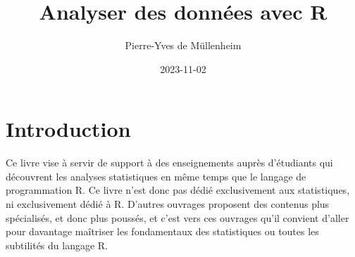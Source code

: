 \documentclass[
]{book}
\title{Analyser des données avec R}
\author{Pierre-Yves de Müllenheim}
\date{2023-11-02}
\begin{document}
\maketitle

\renewcommand*\contentsname{Sommaire}
{
\setcounter{tocdepth}{1}
\tableofcontents
}
\renewcommand{\listfigurename}{Liste des figures}
\renewcommand{\figurename}{Figure}
\renewcommand{\tablename}{Tableau}

\listoftables

\listoffigures

\hypertarget{introduction}{%
\chapter*{Introduction}\label{introduction}}

Ce livre vise à servir de support à des enseignements auprès d'étudiants qui découvrent les analyses statistiques en même temps que le langage de programmation R. Ce livre n'est donc pas dédié exclusivement aux statistiques, ni exclusivement dédié à R. D'autres ouvrages proposent des contenus plus spécialisés, et donc plus poussés, et c'est vers ces ouvrages qu'il convient d'aller pour davantage maîtriser les fondamentaux des statistiques ou toutes les subtilités du langage R.
\end{document}

